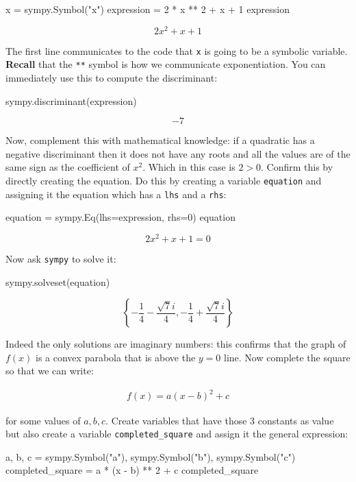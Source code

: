 \begin{pyin}
x = sympy.Symbol("x")
expression = 2 * x ** 2 + x + 1
expression
\end{pyin}

\[
2 x^{2} + x + 1
\]


The first line communicates to the code that \texttt{x} is going to be a symbolic variable.
\textbf{Recall} that the \texttt{**} symbol is how we communicate exponentiation.
You can immediately use this to compute the discriminant:

\begin{pyin}
sympy.discriminant(expression)
\end{pyin}

\[-7\]

Now, complement this with mathematical knowledge: if a quadratic has a
negative discriminant then it does not have any roots and all the values are of
the same sign as the coefficient of \(x ^ 2 \). Which in this case is \(2>0\).
Confirm this by directly creating the equation. Do this by creating a
variable \texttt{equation} and assigning it the equation which has a
\texttt{lhs} and a \texttt{rhs}:

\begin{pyin}
equation = sympy.Eq(lhs=expression, rhs=0)
equation
\end{pyin}

\[2 x^{2} + x + 1 = 0\]

Now ask \texttt{sympy} to solve it:

\begin{pyin}
sympy.solveset(equation)
\end{pyin}

\[\left\{- \frac{1}{4} - \frac{\sqrt{7} i}{4}, - \frac{1}{4} + \frac{\sqrt{7} i}{4}\right\}\]

Indeed the only solutions are imaginary numbers: this confirms that the graph of
\(f(x)\) is a convex parabola that is above the \(y=0\) line.
Now complete the square so that we can write:

\begin{equation*}
\begin{split}
    f(x) = a (x - b) ^ 2 + c
\end{split}
\end{equation*}

for some values of \(a, b, c\).
Create variables that have those 3 constants as value but also create a variable \texttt{completed\_square} and assign it the general expression:

\begin{pyin}
a, b, c = sympy.Symbol("a"), sympy.Symbol("b"), sympy.Symbol("c")
completed_square = a * (x - b) ** 2 + c
completed_square
\end{pyin}

